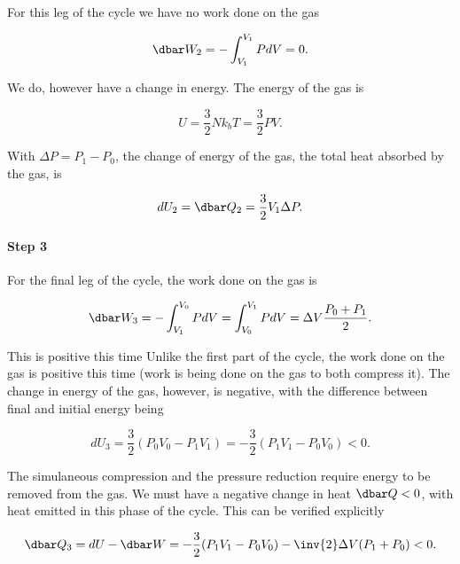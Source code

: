 {For this leg of the cycle we have no work done on the gas

\begin{equation}\label{eqn:basicStatMechProblemSet4Problem2:140}
\dbar W_2 = -\int_{V_1}^{V_1} P dV = 0.
\end{equation}

We do, however have a change in energy.  The energy of the gas is

\begin{equation}\label{eqn:basicStatMechProblemSet4Problem2:160}
U = \frac{3}{2} N k_b T = \frac{3}{2} P V.
\end{equation}

With $\Delta P = P_1 - P_0$, the change of energy of the gas, the total heat absorbed by the gas, is

\begin{equation}\label{eqn:basicStatMechProblemSet4Problem2:180}
dU_2 = \dbar Q_2 = \frac{3}{2} V_1 \Delta P.
\end{equation}

\paragraph{Step 3}

For the final leg of the cycle, the work done on the gas is 

\begin{dmath}\label{eqn:basicStatMechProblemSet4Problem2:200}
\dbar W_3
= 
-\int_{V_1}^{V_0} P dV
= 
\int_{V_0}^{V_1} P dV
=
\Delta V \frac{P_0 + P_1}{2}.
\end{dmath}

This is positive this time 
Unlike the first part of the cycle, the work done on the gas is positive this time (work is being done on the gas to both compress it).  The change in energy of the gas, however, is negative, with the difference between final and initial energy being

\begin{dmath}\label{eqn:basicStatMechProblemSet4Problem2:220}
dU_3
= \frac{3}{2} (P_0 V_0 - P_1 V_1) 
= -\frac{3}{2} (P_1 V_1 - P_0 V_0) 
<0.
\end{dmath}

The simulaneous compression and the pressure reduction require energy to be removed from the gas.  We must have a negative change in heat $\dbar Q < 0$, with heat emitted in this phase of the cycle.  This can be verified explicitly

\begin{dmath}\label{eqn:basicStatMechProblemSet4Problem2:240}
\dbar Q_3
= dU - \dbar W 
= -\frac{3}{2} (P_1 V_1 - P_0 V_0) 
- \inv{2} \Delta V (P_1 + P_0)
< 0.
\end{dmath}

}
